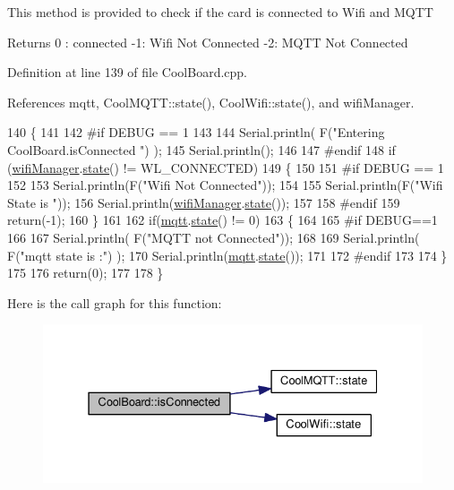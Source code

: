 This method is provided to check if the card is connected to Wifi and M\+Q\+TT

\begin{DoxyReturn}{Returns}
0 \+: connected -\/1\+: Wifi Not Connected -\/2\+: M\+Q\+TT Not Connected 
\end{DoxyReturn}


Definition at line 139 of file Cool\+Board.\+cpp.



References mqtt, Cool\+M\+Q\+T\+T\+::state(), Cool\+Wifi\+::state(), and wifi\+Manager.


\begin{DoxyCode}
140 \{
141 
142 \textcolor{preprocessor}{#if DEBUG == 1  }
143 
144     Serial.println( F(\textcolor{stringliteral}{"Entering CoolBoard.isConnected "}) );
145     Serial.println();
146 
147 \textcolor{preprocessor}{#endif}
148     \textcolor{keywordflow}{if} (\hyperlink{classCoolBoard_acd88e6003606b47479ebba81e4aceeca}{wifiManager}.\hyperlink{classCoolWifi_a1c7b4d82a4098d346e7593dce92039fa}{state}() != WL\_CONNECTED)
149     \{
150 
151 \textcolor{preprocessor}{    #if DEBUG == 1}
152     
153         Serial.println(F(\textcolor{stringliteral}{"Wifi Not Connected"}));
154 
155         Serial.println(F(\textcolor{stringliteral}{"Wifi State is "}));
156         Serial.println(\hyperlink{classCoolBoard_acd88e6003606b47479ebba81e4aceeca}{wifiManager}.\hyperlink{classCoolWifi_a1c7b4d82a4098d346e7593dce92039fa}{state}());
157         
158 \textcolor{preprocessor}{    #endif}
159         \textcolor{keywordflow}{return}(-1);
160     \}
161     
162     \textcolor{keywordflow}{if}(\hyperlink{classCoolBoard_a2399f44d7c23c1149a335cb3b46d90f1}{mqtt}.\hyperlink{classCoolMQTT_a5d003307eff78efbd585e42b43b72b6d}{state}() != 0)
163     \{
164     
165 \textcolor{preprocessor}{    #if DEBUG==1}
166         
167         Serial.println( F(\textcolor{stringliteral}{"MQTT not Connected"}));
168 
169         Serial.println( F(\textcolor{stringliteral}{"mqtt state is :"}) );
170         Serial.println(\hyperlink{classCoolBoard_a2399f44d7c23c1149a335cb3b46d90f1}{mqtt}.\hyperlink{classCoolMQTT_a5d003307eff78efbd585e42b43b72b6d}{state}());  
171     
172 \textcolor{preprocessor}{    #endif}
173 
174     \}
175     
176     \textcolor{keywordflow}{return}(0);
177 
178 \}
\end{DoxyCode}
Here is the call graph for this function\+:
\nopagebreak
\begin{figure}[H]
\begin{center}
\leavevmode
\includegraphics[width=331pt]{classCoolBoard_ad7442cf4b62c7b0d5bd62a0f75ffc065_cgraph}
\end{center}
\end{figure}
